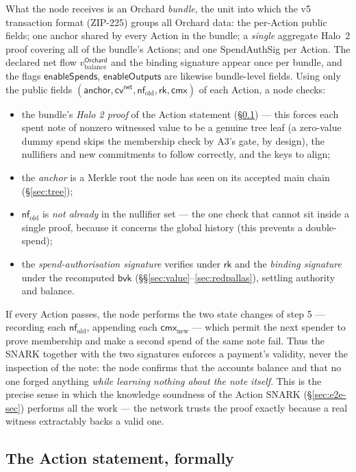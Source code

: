 \documentclass[11pt,a4paper]{article}
\theoremstyle{definition}
\newcommand{\nfsym}{\mathsf{nf}}
\newcommand{\cmx}{\mathsf{cmx}}
\newcommand{\cvsym}{\mathsf{cv}}
\newcommand{\rk}{\mathsf{rk}}
\begin{document}
What the node receives is an Orchard \emph{bundle}, the unit into which the
v5 transaction format (ZIP-225) groups all Orchard data: the per-Action
public fields; one anchor shared by every Action in the bundle; a
\emph{single} aggregate Halo~2 proof covering all of the bundle's Actions;
and one SpendAuthSig per Action. The declared net flow
$v_{\mathrm{balance}}^{\mathsf{Orchard}}$ and the binding signature appear
once per bundle, and the flags $\mathsf{enableSpends}$,
$\mathsf{enableOutputs}$ are likewise bundle-level fields. Using only the
public fields
$(\mathsf{anchor}, \cvsym^{\mathsf{net}}, \nfsym_{\mathrm{old}}, \rk, \cmx)$ of
each Action, a node checks:
\begin{itemize}[leftmargin=*]
\item the bundle's \emph{Halo 2 proof} of the Action statement (\S\ref{sec:action-stmt})
--- this forces each spent note of nonzero witnessed value to be a genuine
tree leaf (a zero-value dummy spend skips the membership check by A3's
gate, by design), the nullifiers and new commitments to follow correctly,
and the keys to align;
\item the \emph{anchor} is a Merkle root the node has seen on its accepted main
chain (\S\ref{sec:tree});
\item $\nfsym_{\mathrm{old}}$ is \emph{not already} in the nullifier set --- the
one check that cannot sit inside a single proof, because it concerns the global
history (this prevents a double-spend);
\item the \emph{spend-authorisation signature} verifies under $\rk$ and the
\emph{binding signature} under the recomputed $\mathsf{bvk}$
(\S\S\ref{sec:value}--\ref{sec:redpallas}), settling authority and balance.
\end{itemize}
If every Action passes, the node performs the two state changes of step 5
--- recording each $\nfsym_{\mathrm{old}}$, appending each
$\cmx_{\mathrm{new}}$ --- which permit the next spender to prove membership
and make a second spend of the same note fail. Thus the SNARK together with the two signatures
enforces a payment's validity, never the inspection of the note: the node
confirms that the accounts balance and that no one forged anything \emph{while
learning nothing about the note itself}. This is the precise sense in which the
knowledge soundness of the Action SNARK (\S\ref{sec:e2e-sec}) performs all the
work --- the network trusts the proof exactly because a real witness extractably
backs a valid one.

\subsection{The Action statement, formally}\label{sec:action-stmt}
\end{document}
